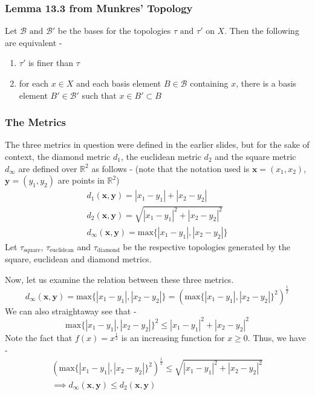 \begin{frame}
    \frametitle{Lemma 13.3 from Munkres' Topology}
    Let $\mathcal{B} \text{ and } \mathcal{B}'$ be the bases for the topologies $\tau \text{ and } \tau'$ on $X$. Then the following are equivalent -
    \begin{enumerate}
        \item $\tau'$ is finer than $\tau$
        \item for each $x \in X$ and each basis element $B \in \mathcal{B}$ containing $x$, there is a basis element $B' \in \mathcal{B}'$ such that $x \in B' \subset B$
    \end{enumerate}
\end{frame}

\begin{frame}
    \frametitle{The Metrics}
    The three metrics in question were defined in the earlier slides, but for the sake of context, the diamond metric $d_1$, the euclidean metric $d_2$ and the square metric $d_\infty$ are defined over $\mathbb{R}^2$ as follows - (note that the notation used is $\boldsymbol{x} = (x_1, x_2)$, $\boldsymbol{y} = (y_1, y_2)$ are points in $\mathbb{R}^2$)
    \begin{gather*}
        d_1(\boldsymbol{x}, \boldsymbol{y}) = |x_1 - y_1| + |x_2 - y_2| \\
        d_2(\boldsymbol{x}, \boldsymbol{y}) = \sqrt{|x_1 - y_1|^2 + |x_2 - y_2|^2} \\
        d_\infty(\boldsymbol{x}, \boldsymbol{y}) = \text{max} \{|x_1 - y_1|, |x_2 - y_2|\}
    \end{gather*}
    Let $\tau_{\text{square}}$, $\tau_{\text{euclidean}}$ and $\tau_{\text{diamond}}$ be the respective topologies generated by the square, euclidean and diamond metrics.
\end{frame}

\begin{frame}
    Now, let us examine the relation between these three metrics.
    \begin{equation*}
        d_\infty(\boldsymbol{x}, \boldsymbol{y}) = \text{max} \{|x_1 - y_1|, |x_2 - y_2|\} = \left(\text{max} \{|x_1 - y_1|, |x_2 - y_2|\}^2 \right)^{\frac{1}{2}}
    \end{equation*}
    \pause
    We can also straightaway see that -
    \begin{equation*}
        \text{max} \{|x_1 - y_1|, |x_2 - y_2|\}^2 \leq |x_1 - y_1|^2 + |x_2 - y_2|^2
    \end{equation*}
    \pause
    Note the fact that $f(x) = x^{\frac{1}{2}}$ is an increasing function for $x \geq 0$. Thus, we have -
    \begin{gather*}
        \left(\text{max} \{|x_1 - y_1|, |x_2 - y_2|\}^2 \right)^{\frac{1}{2}} \leq \sqrt{|x_1 - y_1|^2 + |x_2 - y_2|^2} \\
        \implies d_\infty(\boldsymbol{x}, \boldsymbol{y}) \leq d_2(\boldsymbol{x}, \boldsymbol{y})
    \end{gather*} 
\end{frame}

